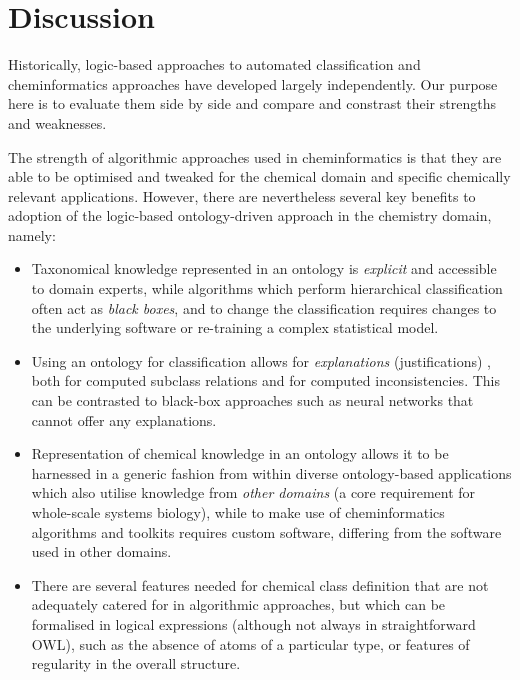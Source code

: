 \documentclass[10pt]{bmc_article}
\newenvironment{bmcformat}{\baselineskip20pt\sloppy\setboolean{publ}{false}}{\baselineskip20pt\sloppy}
\begin{document}
\begin{bmcformat}
\section*{Discussion}



Historically, logic-based approaches to automated classification and cheminformatics approaches have developed largely independently. Our purpose here is to evaluate them side by side and compare and constrast their strengths and weaknesses. 

The strength of algorithmic approaches used in cheminformatics is that they are able to be optimised and tweaked for the chemical domain and specific chemically relevant applications. However, there are nevertheless several key benefits to adoption of the logic-based ontology-driven approach in the chemistry domain, namely:
\begin{itemize}
	\item Taxonomical knowledge represented in an ontology is \textit{explicit} and accessible to domain experts, while algorithms which perform hierarchical classification often act as \textit{black boxes}, and to change the classification requires changes to the underlying software or re-training a complex statistical model.
	\item Using an ontology for classification allows for \textit{explanations} (justifications) \cite{horridgeentail09}, both for computed subclass relations and for computed inconsistencies. This can be contrasted to black-box approaches such as neural networks that cannot offer any explanations. 
	\item Representation of chemical knowledge in an ontology allows it to be harnessed in a generic fashion from within diverse ontology-based applications which also utilise knowledge from \textit{other domains} (a core requirement for whole-scale systems biology), while to make use of cheminformatics algorithms and toolkits requires custom software, differing from the software used in other domains.
	\item There are several features needed for chemical class definition that are not adequately catered for in algorithmic approaches, but which can be formalised in logical expressions (although not always in straightforward OWL), such as the absence of atoms of a particular type, or features of regularity in the overall structure. 
\end{itemize}


\end{bmcformat}
\end{document}
